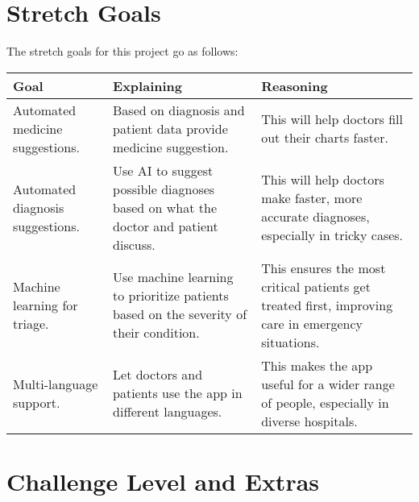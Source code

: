 \documentclass{article}
\begin{document}
\section{Stretch Goals}

The stretch goals for this project go as follows:

\begin{table}[h]
    \centering
    \begin{tabular}{p{4cm} p{4cm} p{4cm}}
        \toprule
        \textbf{Goal} & \textbf{Explaining} & \textbf{Reasoning} \\
        \midrule
        Automated medicine suggestions. & Based on diagnosis and patient data provide medicine suggestion. & This will help doctors fill out their charts faster. \\ %
        \midrule
        Automated diagnosis suggestions.  & Use AI to suggest possible diagnoses based on what the doctor and patient discuss.  & This will help doctors make faster, more accurate diagnoses, especially in tricky cases.\\ 
        \midrule
        Machine learning for triage.  & Use machine learning to prioritize patients based on the severity of their condition. & This ensures the most critical patients get treated first, improving care in emergency situations. \\
        \midrule 
        Multi-language support. & Let doctors and patients use the app in different languages.  & This makes the app useful for a wider range of people, especially in diverse hospitals. \\
        \bottomrule
    \end{tabular}
\end{table}

\section{Challenge Level and Extras}

\end{document}
